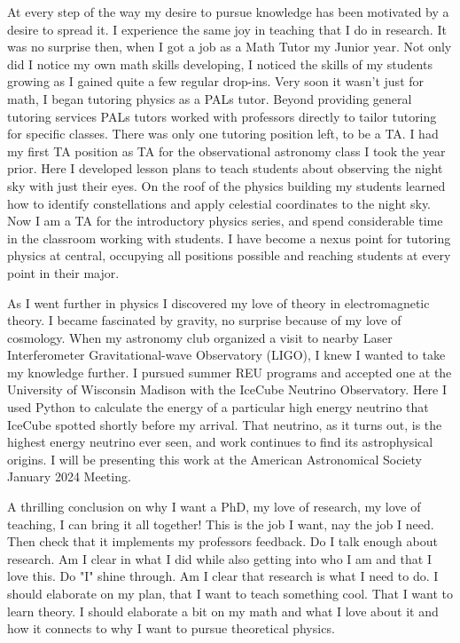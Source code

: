 \documentclass[a4paper, 12pt]{article}
\begin{document}
At every step of the way my desire to pursue knowledge has been motivated by a desire to spread it. I experience the same joy in teaching that I do in research. It was no surprise then, when I got a job as a Math Tutor my Junior year. Not only did I notice my own math skills developing, I noticed the skills of my students growing as I gained quite a few regular drop-ins. Very soon it wasn't just for math, I began tutoring physics as a PALs tutor. Beyond providing general tutoring services PALs tutors worked with professors directly to tailor tutoring for specific classes. There was only one tutoring position left, to be a TA. I had my first TA position as TA for the observational astronomy class I took the year prior. Here I developed lesson plans to teach students about observing the night sky with just their eyes. On the roof of the physics building my students learned how to identify constellations and apply celestial coordinates to the night sky. Now I am a TA for the introductory physics series, and spend considerable time in the classroom working with students. I have become a nexus point for tutoring physics at central, occupying all positions possible and reaching students at every point in their major.

As I went further in physics I discovered my love of theory in electromagnetic theory. I became fascinated by gravity, no surprise because of my love of cosmology. When my astronomy club organized a visit to nearby Laser Interferometer Gravitational-wave Observatory (LIGO), I knew I wanted to take my knowledge further. I pursued summer REU programs and accepted one at the University of Wisconsin Madison with the IceCube Neutrino Observatory. Here I used Python to calculate the energy of a particular high energy neutrino that IceCube spotted shortly before my arrival. That neutrino, as it turns out, is the highest energy neutrino ever seen, and work continues to find its astrophysical origins. I will be presenting this work at the American Astronomical Society January 2024 Meeting.

A thrilling conclusion on why I want a PhD, my love of research, my love of teaching, I can bring it all together! This is the job I want, nay the job I need. Then check that it implements my professors feedback. Do I talk enough about research. Am I clear in what I did while also getting into who I am and that I love this. Do "I" shine through. Am I clear that research is what I need to do. I should elaborate on my plan, that I want to teach something cool. That I want to learn theory. I should elaborate a bit on my math and what I love about it and how it connects to why I want to pursue theoretical physics.
\end{document}
